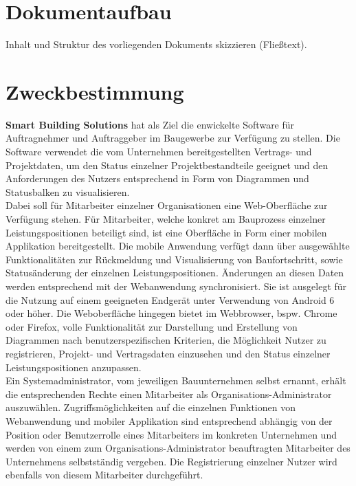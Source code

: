 \section{Dokumentaufbau}\label{sec:dokumentaufbau}
\begin{tcolorbox}
	Inhalt und Struktur des vorliegenden Dokuments skizzieren (Fließtext).
\end{tcolorbox}

\section{Zweckbestimmung}\label{sec:zweckbestimmung}
	\textbf{Smart Building Solutions} hat als Ziel die enwickelte Software f\"ur Auftragnehmer und Auftraggeber im Baugewerbe zur Verf\"ugung zu stellen.  Die Software verwendet die vom Unternehmen bereitgestellten Vertrags- und Projektdaten,  um den Status einzelner Projektbestandteile geeignet und den Anforderungen des Nutzers entsprechend in Form von Diagrammen und Statusbalken zu visualisieren. \\
Dabei soll f\"ur Mitarbeiter einzelner Organisationen eine Web-Oberfl\"ache zur Verf\"ugung stehen.  F\"ur  Mitarbeiter,  welche konkret am Bauprozess einzelner Leistungspositionen beteiligt sind,  ist eine Oberfl\"ache in Form einer mobilen Applikation bereitgestellt.  Die mobile Anwendung verf\"ugt dann \"uber ausgew\"ahlte Funktionalit\"aten zur R\"uckmeldung und Visualisierung von Baufortschritt,  sowie Status\"anderung der einzelnen Leistungspositionen.  \"Anderungen an diesen Daten werden entsprechend mit der Webanwendung synchronisiert.  Sie ist ausgelegt f\"ur die Nutzung auf einem geeigneten Endger\"at unter Verwendung von Android 6 oder h\"oher.  Die Weboberfl\"ache hingegen bietet im Webbrowser,  bspw. Chrome oder Firefox, volle Funktionalit\"at zur Darstellung und Erstellung von Diagrammen nach benutzerspezifischen Kriterien, die M\"oglichkeit Nutzer zu registrieren,  Projekt- und Vertragsdaten einzusehen und den Status einzelner Leistungspositionen anzupassen. \\
 Ein Systemadministrator, vom jeweiligen Bauunternehmen selbst ernannt,  erh\"alt die entsprechenden Rechte  einen Mitarbeiter als Organisations-Administrator auszuw\"ahlen.
Zugriffsm\"oglichkeiten auf die einzelnen Funktionen von Webanwendung und mobiler Applikation sind entsprechend abh\"angig von der Position oder Benutzerrolle eines Mitarbeiters im konkreten Unternehmen und werden von einem zum Organisations-Administrator beauftragten Mitarbeiter des Unternehmens selbstst\"andig vergeben.  Die Registrierung einzelner Nutzer wird ebenfalls von diesem Mitarbeiter durchgef\"uhrt. 

